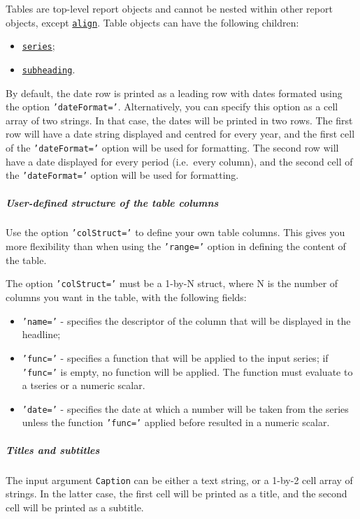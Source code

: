  Tables are top-level report objects and cannot be nested within other
 report objects, except \href{report/align}{\texttt{align}}. Table
 objects can have the following children:
 
 \begin{itemize}
 \item
   \href{report/series}{\texttt{series}};
 \item
   \href{report/subheading}{\texttt{subheading}}.
 \end{itemize}
 
 By default, the date row is printed as a leading row with dates formated
 using the option \texttt{'dateFormat='}. Alternatively, you can specify
 this option as a cell array of two strings. In that case, the dates will
 be printed in two rows. The first row will have a date string displayed
 and centred for every year, and the first cell of the
 \texttt{'dateFormat='} option will be used for formatting. The second
 row will have a date displayed for every period (i.e.~every column), and
 the second cell of the \texttt{'dateFormat='} option will be used for
 formatting.
 
 \subparagraph{User-defined structure of the table columns}
 
 Use the option \texttt{'colStruct='} to define your own table columns.
 This gives you more flexibility than when using the \texttt{'range='}
 option in defining the content of the table.
 
 The option \texttt{'colStruct='} must be a 1-by-N struct, where N is the
 number of columns you want in the table, with the following fields:
 
 \begin{itemize}
 \item
   \texttt{'name='} - specifies the descriptor of the column that will be
   displayed in the headline;
 \item
   \texttt{'func='} - specifies a function that will be applied to the
   input series; if \texttt{'func='} is empty, no function will be
   applied. The function must evaluate to a tseries or a numeric scalar.
 \item
   \texttt{'date='} - specifies the date at which a number will be taken
   from the series unless the function \texttt{'func='} applied before
   resulted in a numeric scalar.
 \end{itemize}
 
 \subparagraph{Titles and subtitles}
 
 The input argument \texttt{Caption} can be either a text string, or a
 1-by-2 cell array of strings. In the latter case, the first cell will be
 printed as a title, and the second cell will be printed as a subtitle.
 

